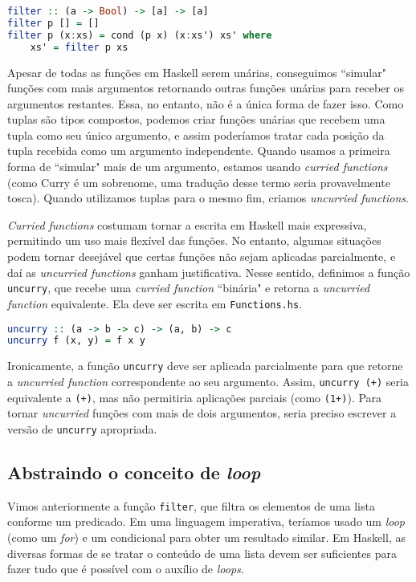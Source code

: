 \documentclass[a4paper]{article}
\begin{document}
\begin{lstlisting}[language=haskell, frame=single]
filter :: (a -> Bool) -> [a] -> [a]
filter p [] = []
filter p (x:xs) = cond (p x) (x:xs') xs' where
	xs' = filter p xs
\end{lstlisting}

Apesar de todas as funções em Haskell serem unárias, conseguimos ``simular" funções com mais argumentos retornando outras funções unárias para receber os argumentos restantes.
Essa, no entanto, não é a única forma de fazer isso.
Como tuplas são tipos compostos, podemos criar funções unárias que recebem uma tupla como seu único argumento, e assim poderíamos tratar cada posição da tupla recebida como um argumento independente.
Quando usamos a primeira forma de ``simular" mais de um argumento, estamos usando \emph{curried functions} (como Curry é um sobrenome, uma tradução desse termo seria provavelmente tosca).
Quando utilizamos tuplas para o mesmo fim, criamos \emph{uncurried functions}.

\emph{Curried functions} costumam tornar a escrita em Haskell mais expressiva, permitindo um uso mais flexível das funções.
No entanto, algumas situações podem tornar desejável que certas funções não sejam aplicadas parcialmente, e daí as \emph{uncurried functions} ganham justificativa.
Nesse sentido, definimos a função \texttt{uncurry}, que recebe uma \emph{curried function} ``binária" e retorna a \emph{uncurried function} equivalente.
Ela deve ser escrita em \texttt{Functions.hs}.

\begin{lstlisting}[language=haskell, frame=single]
uncurry :: (a -> b -> c) -> (a, b) -> c
uncurry f (x, y) = f x y
\end{lstlisting}

Ironicamente, a função \texttt{uncurry} deve ser aplicada parcialmente para que retorne a \emph{uncurried function} correspondente ao seu argumento.
Assim, \texttt{uncurry (+)} seria equivalente a \texttt{(+)}, mas não permitiria aplicações parciais (como \texttt{(1+)}).
Para tornar \emph{uncurried} funções com mais de dois argumentos, seria preciso escrever a versão de \texttt{uncurry} apropriada.

\subsection{Abstraindo o conceito de \emph{loop}}

Vimos anteriormente a função \texttt{filter}, que filtra os elementos de uma lista conforme um predicado.
Em uma linguagem imperativa, teríamos usado um \emph{loop} (como um \emph{for}) e um condicional para obter um resultado similar.
Em Haskell, as diversas formas de se tratar o conteúdo de uma lista devem ser suficientes para fazer tudo que é possível com o auxílio de \emph{loops}.
\end{document}
